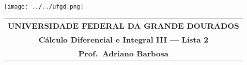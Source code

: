 \documentclass[a4paper,5pt]{amsbook}
\begin{document}
\thispagestyle{empty}
\pagestyle{empty}
\begin{minipage}[h]{0.14\textwidth}
	\texttt{[image: ../../ufgd.png]}
\end{minipage}
\begin{minipage}[h]{\textwidth}
\begin{tabular}{c}
{{\bf UNIVERSIDADE FEDERAL DA GRANDE DOURADOS}}\\
{{\bf C\'alculo Diferencial e Integral III --- Lista 2}}\\
{{\bf Prof.\ Adriano Barbosa}}\\
\end{tabular}
\vspace{-0.45cm}
%
\end{minipage}

\end{document}
